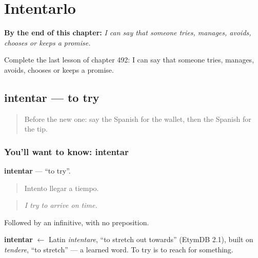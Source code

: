 
\chapter{Intentarlo}
\label{ch:es-intentarlo}

\begin{chapteropening}
\textbf{By the end of this chapter:} \emph{I can say that someone tries, manages, avoids, chooses or keeps a promise.}

Complete the last lesson of chapter 492: I can say that someone tries, manages, avoids, chooses or keeps a promise.
\end{chapteropening}

\section[intentar]{intentar — to try}

\label{lesson:ES-C492-intentar}



\begin{quote}
Before the new one: say the Spanish for the wallet, then the Spanish for the tip.
\end{quote}

\subsection*{You'll want to know: intentar}
\textbf{intentar} — \textquotedblleft{}to try\textquotedblright{}.

\begin{quote}
Intento llegar a tiempo.
\end{quote}

\begin{quote}
\emph{I try to arrive on time.}
\end{quote}

Followed by an infinitive, with no preposition.

\begin{cousinweb}
\textbf{intentar} $\leftarrow$ Latin \emph{intentare}, \textquotedblleft{}to stretch out towards\textquotedblright{} (EtymDB 2.1), built on \emph{tendere}, \textquotedblleft{}to stretch\textquotedblright{} — a learned word. To try is to reach for something.
\end{cousinweb}


